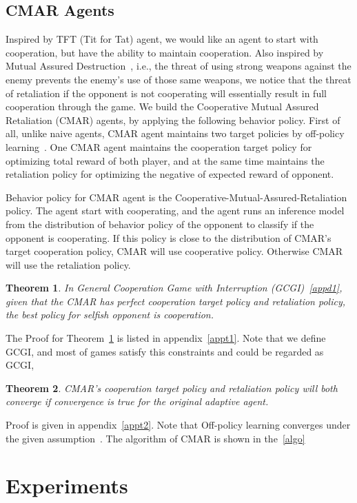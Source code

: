 \documentclass{article}
\newtheorem{theorem}{Theorem}
\begin{document}
\subsection{CMAR Agents}
Inspired by TFT (Tit for Tat) agent, we would like an agent to start with cooperation,
but have the ability to maintain cooperation.
Also inspired by Mutual Assured Destruction~\cite{ni2014mutually},
i.e., the threat of using strong weapons against the enemy
prevents the enemy's use of those same weapons,
we notice that the threat of retaliation if the opponent is not cooperating will
essentially result in full cooperation through the game.
We build the Cooperative Mutual Assured Retaliation (CMAR) agents,
by applying the following behavior policy.
First of all, unlike naive agents,
CMAR agent maintains two target policies by off-policy learning~\cite{precup2001off}.
One CMAR agent maintains the cooperation target policy for optimizing total reward of both player,
and at the same time
maintains the retaliation policy for optimizing the negative of expected reward of opponent.

Behavior policy for CMAR agent is the Cooperative-Mutual-Assured-Retaliation policy.
The agent start with cooperating,
and the agent runs an inference model from the distribution of behavior policy
of the opponent to classify if the opponent is cooperating.
If this policy is close to the distribution of CMAR's target cooperation policy,
CMAR will use cooperative policy.
Otherwise CMAR will use the retaliation policy.

\begin{theorem}\label{t1}
    In General Cooperation Game with Interruption (GCGI)~\ref{appd1},
    given that the CMAR has perfect cooperation target policy and retaliation policy,
    the best policy for selfish opponent is cooperation.
\end{theorem}
The Proof for Theorem~\ref{t1} is listed in appendix~\ref{appt1}.
Note that we define GCGI,
and most of games satisfy this constraints and could be regarded as GCGI,

\begin{theorem}\label{t2}
    CMAR's cooperation target policy and retaliation policy will both converge if convergence is true for the original adaptive agent.
\end{theorem}
Proof is given in appendix~\ref{appt2}.
Note that Off-policy learning converges under the given assumption~\cite{precup2001off}.
The algorithm of CMAR is shown in the~\ref{algo}
\section{Experiments}
\end{document}
